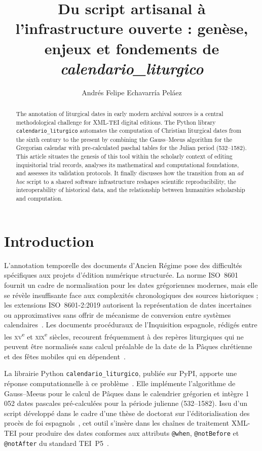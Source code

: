 \documentclass[final, fra]{anthology-ch}     %
\title{Du script artisanal à l'infrastructure ouverte : genèse, enjeux et fondements de \textit{calendario\_liturgico}}
\author[1]{Andrés Felipe Echavarría Peláez}[
  orcid=0009-0003-1540-8678,
  email=andres.echavarria@cnrs.fr
]
\affiliation{1}{Consortium ARIANE- IR* Huma-Num}
\begin{document}
\maketitle

\begin{abstract}
The annotation of liturgical dates in early modern archival sources is a central methodological challenge for XML-TEI digital editions. The Python library \texttt{calendario\_liturgico} automates the computation of Christian liturgical dates from the sixth century to the present by combining the Gauss--Meeus algorithm for the Gregorian calendar with pre-calculated paschal tables for the Julian period (532--1582). This article situates the genesis of this tool within the scholarly context of editing inquisitorial trial records, analyses its mathematical and computational foundations, and assesses its validation protocols. It finally discusses how the transition from an \textit{ad hoc} script to a shared software infrastructure reshapes scientific reproducibility, the interoperability of historical data, and the relationship between humanities scholarship and computation.
\end{abstract}

\section{Introduction} \label{sec:introduction}

L'annotation temporelle des documents d'Ancien Régime pose des difficultés spécifiques aux projets d'édition numérique structurée. La norme ISO~8601 fournit un cadre de normalisation pour les dates grégoriennes modernes, mais elle se révèle insuffisante face aux complexités chronologiques des sources historiques ; les extensions ISO~8601-2:2019 autorisent la représentation de dates incertaines ou approximatives sans offrir de mécanisme de conversion entre systèmes calendaires~\cite{iso8601-2}. Les documents procéduraux de l'Inquisition espagnole, rédigés entre les \textsc{xv}\textsuperscript{e} et \textsc{xix}\textsuperscript{e} siècles, recourent fréquemment à des repères liturgiques qui ne peuvent être normalisés sans calcul préalable de la date de la Pâques chrétienne et des fêtes mobiles qui en dépendent~\cite{echavarria2025these}.

La librairie Python \texttt{calendario\_liturgico}, publiée sur PyPI, apporte une réponse computationnelle à ce problème~\cite{echavarria2025pypi}. Elle implémente l'algorithme de Gauss--Meeus pour le calcul de Pâques dans le calendrier grégorien et intègre 1\,052 dates pascales pré-calculées pour la période julienne (532--1582). Issu d'un script développé dans le cadre d'une thèse de doctorat sur l'éditorialisation des procès de foi espagnols~\cite{echavarria2025these}, cet outil s'insère dans les chaînes de traitement XML-TEI pour produire des dates conformes aux attributs \texttt{@when}, \texttt{@notBefore} et \texttt{@notAfter} du standard TEI~P5~\cite{tei2025,burnard2014}.
\end{document}

